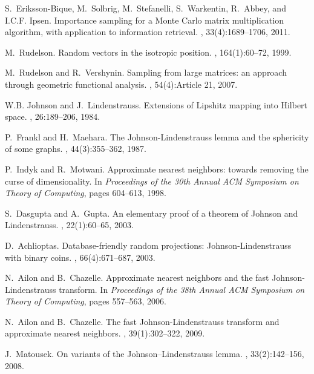\documentclass[twoside]{article}
\begin{document}
\begin{small}
\begin{thebibliography}{100}
S.~Eriksson-Bique, M.~Solbrig, M.~Stefanelli, S.~Warkentin, R.~Abbey, and
  I.C.F. Ipsen.
\newblock Importance sampling for a {Monte Carlo} matrix multiplication
  algorithm, with application to information retrieval.
, 33(4):1689--1706, 2011.

M.~Rudelson.
\newblock Random vectors in the isotropic position.
, 164(1):60--72, 1999.

M.~Rudelson and R.~Vershynin.
\newblock Sampling from large matrices: an approach through geometric
  functional analysis.
, 54(4):Article 21, 2007.

W.B. Johnson and J.~Lindenstrauss.
\newblock Extensions of {L}ipshitz mapping into {H}ilbert space.
, 26:189--206, 1984.

P.~Frankl and H.~Maehara.
\newblock The {J}ohnson-{L}indenstrauss lemma and the sphericity of some
  graphs.
, 44(3):355--362, 1987.

P.~Indyk and R.~Motwani.
\newblock Approximate nearest neighbors: towards removing the curse of
  dimensionality.
\newblock In {\em Proceedings of the 30th Annual ACM Symposium on Theory of
  Computing}, pages 604--613, 1998.

S.~Dasgupta and A.~Gupta.
\newblock An elementary proof of a theorem of {J}ohnson and {L}indenstrauss.
, 22(1):60--65, 2003.

D.~Achlioptas.
\newblock Database-friendly random projections: {J}ohnson-{L}indenstrauss with
  binary coins.
, 66(4):671--687, 2003.

N.~Ailon and B.~Chazelle.
\newblock Approximate nearest neighbors and the fast {J}ohnson-{L}indenstrauss
  transform.
\newblock In {\em Proceedings of the 38th Annual ACM Symposium on Theory of
  Computing}, pages 557--563, 2006.

N.~Ailon and B.~Chazelle.
\newblock The fast {J}ohnson-{L}indenstrauss transform and approximate nearest
  neighbors.
, 39(1):302--322, 2009.

J.~Matousek.
\newblock On variants of the {J}ohnson--{L}indenstrauss lemma.
, 33(2):142--156, 2008.


\end{thebibliography}
\end{small}
\end{document}
